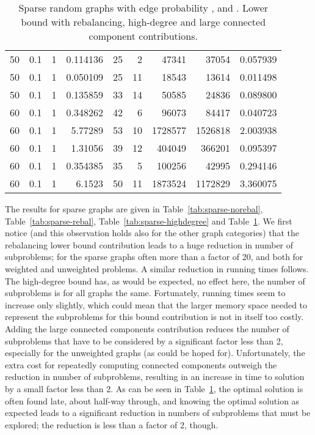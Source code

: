 \documentclass[a4paper,11pt]{article}
\begin{document}
\begin{table}
\begin{center}
\begin{tabular}{|rrr|r|r|rrr|r|}
50 & 0.1 & 1 & 0.114136 & 25 & 2 & 47341 & 37054 & 0.057939 \\
50 & 0.1 & 1 & 0.050109 & 25 & 11 & 18543 & 13614 & 0.011498 \\
50 & 0.1 & 1 & 0.135859 & 33 & 14 & 50585 & 24836 & 0.089800 \\
60 & 0.1 & 1 & 0.348262 & 42 & 6 & 96073 & 84417 & 0.040723 \\
60 & 0.1 & 1 & 5.77289 & 53 & 10 & 1728577 & 1526818 & 2.003938 \\
60 & 0.1 & 1 & 1.31056 & 39 & 12 & 404049 & 366201 & 0.095397 \\
60 & 0.1 & 1 & 0.354385 & 35 & 5 & 100256 & 42995 & 0.294146 \\
60 & 0.1 & 1 & 6.1523 & 50 & 11 & 1873524 & 1172829 & 3.360075 \\
\hline
\end{tabular}
\end{center}
\caption{Sparse random graphs with edge probability ,
   and . Lower bound with rebalancing, 
  high-degree and large connected component contributions.}
\label{tab:sparse-all}
\end{table}

The results for sparse graphs are given in
Table~\ref{tab:sparse-norebal}, Table~\ref{tab:sparse-rebal},
Table~\ref{tab:sparse-highdegree} and Table~\ref{tab:sparse-all}.  We
first notice (and this observation holds also for the other graph
categories) that the rebalancing lower bound contribution leads to a
huge reduction in number of subproblems; for the sparse graphs often
more than a factor of 20, and both for weighted and unweighted
problems. A similar reduction in running times follows. The
high-degree bound has, as would be expected, no effect here, the
number of subproblems is for all graphs the same. Fortunately, running
times seem to increase only slightly, which could mean that the
larger memory space needed to represent the subproblems for this bound
contribution is not in itself too costly. Adding the large connected
components contribution reduces the number of subproblems that have to
be considered by a significant factor less than 2, especially for the
unweighted graphs (as could be hoped for). Unfortunately, the extra
cost for repeatedly computing connected components outweigh the
reduction in number of subproblems, resulting in an increase in time
to solution by a small factor less than 2. As can be seen in
Table~\ref{tab:sparse-all}, the optimal solution is often found late,
about half-way through, and knowing the optimal solution as expected
leads to a significant reduction in numbers of subproblems that must
be explored; the reduction is less than a factor of 2, though.
\end{document}
